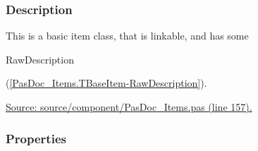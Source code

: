\documentclass{report}
\begin{document}
\subsubsection*{\large{\textbf{Description}}\normalsize\hspace{1ex}\hfill}
This is a basic item class, that is linkable, and has some \begin{ttfamily}RawDescription\end{ttfamily}(\ref{PasDoc_Items.TBaseItem-RawDescription}).\par
\href{https://github.com/pasdoc/pasdoc/blob/master/source/component/PasDoc_Items.pas#L157}{Source: source/component/PasDoc{\_}Items.pas (line 157).}\subsubsection*{\large{\textbf{Properties}}\normalsize\hspace{1ex}\hfill}
\end{document}
